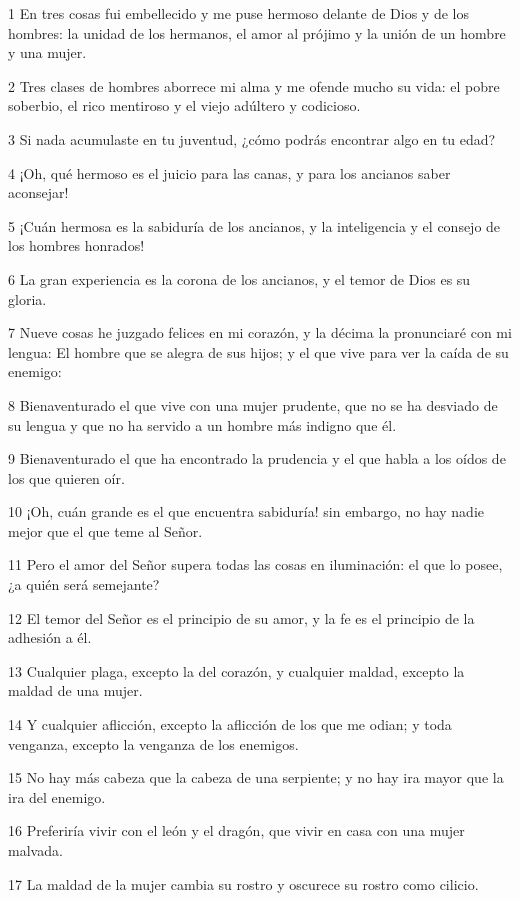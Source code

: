 \par 1 En tres cosas fui embellecido y me puse hermoso delante de Dios y de los hombres: la unidad de los hermanos, el amor al prójimo y la unión de un hombre y una mujer.
\par 2 Tres clases de hombres aborrece mi alma y me ofende mucho su vida: el pobre soberbio, el rico mentiroso y el viejo adúltero y codicioso.
\par 3 Si nada acumulaste en tu juventud, ¿cómo podrás encontrar algo en tu edad?
\par 4 ¡Oh, qué hermoso es el juicio para las canas, y para los ancianos saber aconsejar!
\par 5 ¡Cuán hermosa es la sabiduría de los ancianos, y la inteligencia y el consejo de los hombres honrados!
\par 6 La gran experiencia es la corona de los ancianos, y el temor de Dios es su gloria.
\par 7 Nueve cosas he juzgado felices en mi corazón, y la décima la pronunciaré con mi lengua: El hombre que se alegra de sus hijos; y el que vive para ver la caída de su enemigo:
\par 8 Bienaventurado el que vive con una mujer prudente, que no se ha desviado de su lengua y que no ha servido a un hombre más indigno que él.
\par 9 Bienaventurado el que ha encontrado la prudencia y el que habla a los oídos de los que quieren oír.
\par 10 ¡Oh, cuán grande es el que encuentra sabiduría! sin embargo, no hay nadie mejor que el que teme al Señor.
\par 11 Pero el amor del Señor supera todas las cosas en iluminación: el que lo posee, ¿a quién será semejante?
\par 12 El temor del Señor es el principio de su amor, y la fe es el principio de la adhesión a él.
\par 13 Cualquier plaga, excepto la del corazón, y cualquier maldad, excepto la maldad de una mujer.
\par 14 Y cualquier aflicción, excepto la aflicción de los que me odian; y toda venganza, excepto la venganza de los enemigos.
\par 15 No hay más cabeza que la cabeza de una serpiente; y no hay ira mayor que la ira del enemigo.
\par 16 Preferiría vivir con el león y el dragón, que vivir en casa con una mujer malvada.
\par 17 La maldad de la mujer cambia su rostro y oscurece su rostro como cilicio.
